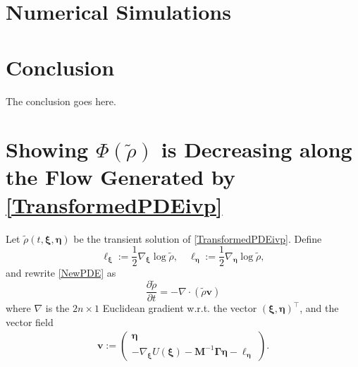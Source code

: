\documentclass[10pt,twocolumn]{IEEEtran}
\begin{document}

\section{Numerical Simulations}\label{sec:NumericalSimulations}



\section{Conclusion}\label{sec:conclusion}
The conclusion goes here.


\appendices
\section{Showing $\Phi(\tilde{\rho})$ is Decreasing along the Flow Generated by \eqref{TransformedPDEivp}}\label{AppLyap}
Let $\tilde{\rho}(t,\bm{\xi},\bm{\eta})$ be the transient solution of \eqref{TransformedPDEivp}. Define
$$\bm{\ell}_{\bm{\xi}} := \frac{1}{2}\nabla_{\bm{\xi}}\log\tilde{\rho}, \quad \bm{\ell}_{\bm{\eta}} := \frac{1}{2}\nabla_{\bm{\eta}}\log\tilde{\rho},$$
and rewrite \eqref{NewPDE} as
$$\dfrac{\partial\tilde{\rho}}{\partial t} = - \nabla\cdot\left(\tilde{\rho}\bm{v}\right)$$
where $\nabla$ is the $2n\times 1$ Euclidean gradient w.r.t. the vector $(\bm{\xi},\bm{\eta})^{\top}$, and the vector field
\begin{align}
\bm{v} := \begin{pmatrix}
 \bm{\eta}\\
 -\nabla_{\bm{\xi}}U(\bm{\xi}) - \bm{M}^{-1}\bm{\Gamma}\bm{\eta} - \bm{\ell}_{\bm{\eta}}	
 \end{pmatrix}.
\label{defvectorfieldv}	
\end{align}
\end{document}
